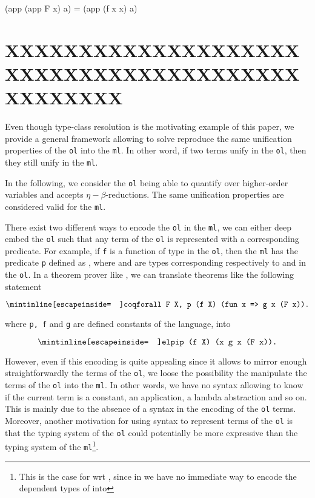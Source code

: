 \documentclass[sigconf,natbib=false]{acmart}
\def\elpi{\proglang{elpi}}
\def\coq{\proglang{coq}}
\newcommand*{\acronym}[1]{\texttt{#1}\xspace}
\def\ol{\acronym{ol}} %
\def\ml{\acronym{ml}} %
\begin{document}
\begin{elpicode}
  (app (app F x) a) = (app (f x x) a)
\end{elpicode}




\section{XXXXXXXXXXXXXXXXXXXXXXXXXXXXXXXXXXXXXXXXXXXXXXXX}

Even though type-class resolution is the motivating example of this paper, we
provide a general framework allowing to solve reproduce the same unification
properties of the \ol into the \ml. In other word, if two terms unify in the
\ol, then they still unify in the \ml. 

In the following, we consider the \ol being able to quantify over higher-order
variables and accepts $\eta-\beta$-reductions. The same unification properties
are considered valid for the \ml.

There exist two different ways to encode the \ol in the \ml, we can either deep
embed the \ol such that any term of the \ol is represented with a corresponding
predicate. For example, if \texttt{f} is a function of type  in
the \ol, then the \ml has the predicate \texttt{p} defined as , where  and  are types corresponding
respectively to  and  in the \ol. In a theorem prover like
\coq, we can translate theorems like the following statement

\begin{equation}
  \texttt{\coqIn{forall F X, p (f X) (fun x => g x (F x)).}}
  \label{eq:coq1}
\end{equation}

where \texttt{p, f} and \texttt{g} are defined constants of the language, into

\begin{equation}
  \texttt{\elpiIn{p (f X) (x\ g x (F x)).}}
\end{equation}

\noindent However, even if this encoding is quite appealing since it allows to
mirror enough straightforwardly the terms of the \ol, we loose the possibility
the manipulate the terms of the \ol into the \ml. In other words, we have no
syntax allowing to know if the current term is a constant, an application, a
lambda abstraction and so on. This is mainly due to the absence of a syntax in
the encoding of the \ol terms. Moreover, another motivation for using syntax to
represent terms of the \ol is that  the typing system of the \ol could
potentially be more expressive than the typing system of the \ml\footnote{This
is the case for \coq wrt \elpi, since in we have no immediate way to encode
the dependent types of \coq into \elpi}.
\end{document}
